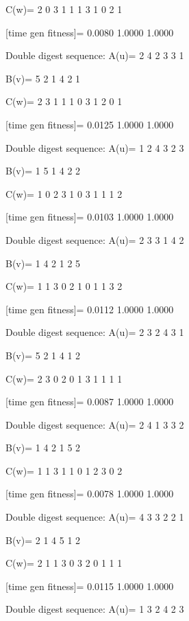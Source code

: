 C(w)=
     2     0     3     1     1     1     3     1     0     2     1

[time gen fitness]=
    0.0080    1.0000    1.0000

Double digest sequence:
A(u)=
     2     4     2     3     3     1

B(v)=
     5     2     1     4     2     1

C(w)=
     2     3     1     1     1     0     3     1     2     0     1

[time gen fitness]=
    0.0125    1.0000    1.0000

Double digest sequence:
A(u)=
     1     2     4     3     2     3

B(v)=
     1     5     1     4     2     2

C(w)=
     1     0     2     3     1     0     3     1     1     1     2

[time gen fitness]=
    0.0103    1.0000    1.0000

Double digest sequence:
A(u)=
     2     3     3     1     4     2

B(v)=
     1     4     2     1     2     5

C(w)=
     1     1     3     0     2     1     0     1     1     3     2

[time gen fitness]=
    0.0112    1.0000    1.0000

Double digest sequence:
A(u)=
     2     3     2     4     3     1

B(v)=
     5     2     1     4     1     2

C(w)=
     2     3     0     2     0     1     3     1     1     1     1

[time gen fitness]=
    0.0087    1.0000    1.0000

Double digest sequence:
A(u)=
     2     4     1     3     3     2

B(v)=
     1     4     2     1     5     2

C(w)=
     1     1     3     1     1     0     1     2     3     0     2

[time gen fitness]=
    0.0078    1.0000    1.0000

Double digest sequence:
A(u)=
     4     3     3     2     2     1

B(v)=
     2     1     4     5     1     2

C(w)=
     2     1     1     3     0     3     2     0     1     1     1

[time gen fitness]=
    0.0115    1.0000    1.0000

Double digest sequence:
A(u)=
     1     3     2     4     2     3

